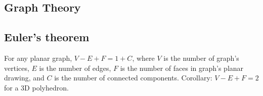 \documentclass[12pt]{extarticle}
\begin{document}
\begin{multicols*}{2}







\section{Graph Theory}

\subsection{Euler's theorem} For any planar graph, $V - E + F = 1 + C$,
where $V$ is the number of graph's vertices, $E$ is the number of edges,
$F$ is the number of faces in graph's planar drawing, and $C$ is the number
of connected components.  Corollary: $V - E + F = 2$ for a 3D polyhedron.



\end{multicols*}
\end{document}

